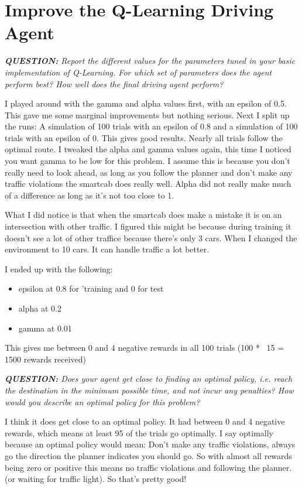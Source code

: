 \documentclass[11pt]{article}
\begin{document}
\section{Improve the Q-Learning Driving Agent}
\begin{center}
\textit{\textbf{QUESTION:} Report the different values for the parameters tuned in your basic implementation of Q-Learning. For which set of parameters does the agent perform best? How well does the final driving agent perform?}
\end{center}
 I played around with the gamma and alpha values first, with an epsilon of 0.5. This gave me some marginal improvements but nothing serious. Next I split up the runs: A simulation of 100 trials with an epsilon of 0.8 and a simulation of 100 trials with an epsilon of 0. This gives good results. Nearly all trials follow the optimal route. I tweaked the alpha and gamma values again, this time I noticed you want gamma to be low for this problem. I assume this is because you don't really need to look ahead, as long as you follow the planner and don't make any traffic violations the smartcab does really well. Alpha did not really make much of a difference as long as it's not too close to 1. \par
What I did notice is that when the smartcab does make a mistake it is on an intersection with other traffic. I figured this might be because during training it doesn't see a lot of other traffice because there's only 3 cars. When I changed the environment to 10 cars. It can handle traffic a lot better.

I ended up with the following:
\begin{itemize}
\item epsilon at 0.8 for 'training and 0 for test
\item alpha at 0.2
\item gamma at 0.01
\end{itemize}

This gives me between 0 and 4 negative rewards in all 100 trials (100 * ~15 = 1500 rewards received)

\begin{center}
\textit{\textbf{QUESTION:} Does your agent get close to finding an optimal policy, i.e. reach the destination in the minimum possible time, and not incur any penalties? How would you describe an optimal policy for this problem?}
\end{center}

I think it does get close to an optimal policy. It had between 0 and 4 negative rewards, which means at least 95 of the trials go optimally. I say optimally because an optimal policy would mean: Don't make any traffic violations, always go the direction the planner indicates you should go. So with almost all rewards being zero or positive this  means no traffic violations and following the planner. (or waiting for traffic light). So that's pretty good!
\end{document}
